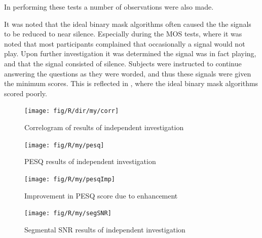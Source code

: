 In performing these tests a number of observations were also made.

It was noted that the ideal binary mask algorithms often caused the
the signals to be reduced to near silence. Especially during the \ac{MOS}
tests, where it was noted that most participants complained that occasionally
a signal would not play. Upon further investigation it was determined
the signal was in fact playing, and that the signal consisted of silence.
Subjects were instructed to continue answering the questions as they
were worded, and thus these signals were given the minimum scores.
This is reflected in ,
where the ideal binary mask algorithms scored poorly.

\begin{figure}[h]
\noindent \begin{centering}
\texttt{[image: fig/R/dir/my/corr]}
\par\end{centering}

\protect\caption{\label{fig:my-Corr}\foreignlanguage{australian}{Correlogram of results
of independent investigation}%
}
\end{figure}


\begin{figure}[p]
\noindent \begin{centering}
\texttt{[image: fig/R/my/pesq]}
\par\end{centering}

\protect\caption{\label{fig:my-PESQ}\foreignlanguage{australian}{\acs{PESQ} results
of independent investigation}%
}
\end{figure}


\begin{figure}[p]
\noindent \begin{centering}
\texttt{[image: fig/R/my/pesqImp]}
\par\end{centering}

\protect\caption{\label{fig:my-PESQ-imp}Improvement in \foreignlanguage{australian}{\acs{PESQ}
score due to enhancement}%
}
\end{figure}


\begin{figure}[h]
\noindent \begin{centering}
\texttt{[image: fig/R/my/segSNR]}
\par\end{centering}

\protect\caption{\label{fig:my-segSNR}Segmental \foreignlanguage{australian}{\acs{SNR}
results of independent investigation}%
}
\end{figure}


